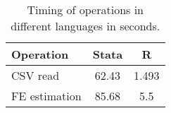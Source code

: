 \documentclass[12pt]{article}
\begin{document}
\begin{table}[]
\centering
\begin{tabular}{lcc}
\toprule
    Operation & Stata & R  \\
    \midrule
    CSV read & 62.43 & 1.493  \\
    FE estimation & 85.68 & 5.5  \\
    \bottomrule
\end{tabular}
\caption{Timing of operations in different languages in seconds.\label{tab:3}}
\end{table}
\nocite{*}

\newpage



\end{document}
